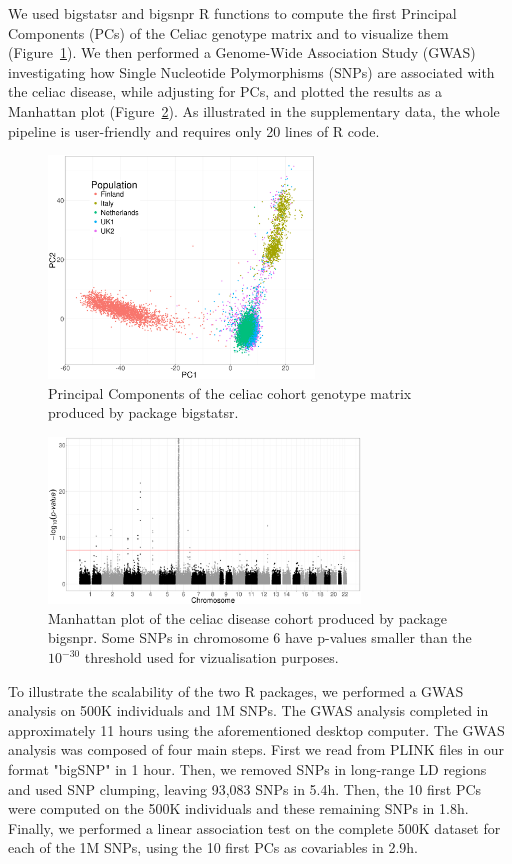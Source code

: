\documentclass{bioinfo}
\begin{document}
We used bigstatsr and bigsnpr R functions to compute the first Principal Components (PCs) of the Celiac genotype matrix and to visualize them (Figure~\ref{fig:pca}). We then performed a Genome-Wide Association Study (GWAS) investigating how Single Nucleotide Polymorphisms (SNPs) are associated with the celiac disease, while adjusting for PCs, and plotted the results as a Manhattan plot (Figure~\ref{fig:gwas}). As illustrated in the supplementary data, the whole pipeline is user-friendly and requires only 20 lines of R code.

\begin{figure}[!tpb]
\centerline{\includegraphics[width=200pt]{celiac-pca}}
\caption{Principal Components of the celiac cohort genotype matrix produced by package bigstatsr.}\label{fig:pca}
\end{figure}

\begin{figure}[!tpb]
\centerline{\includegraphics[width=235pt]{celiac-gwas-cut}}
\caption{Manhattan plot of the celiac disease cohort produced by package bigsnpr. Some SNPs in chromosome 6 have p-values smaller than the $10^{-30}$ threshold used for vizualisation purposes.}\label{fig:gwas}
\end{figure}

To illustrate the scalability of the two R packages, we performed a GWAS analysis on 500K individuals and 1M SNPs. The GWAS analysis completed in approximately 11 hours using the aforementioned desktop computer. The GWAS analysis was composed of four main steps. 
First we read from PLINK files in our format "bigSNP" in 1 hour.
Then, we removed SNPs in long-range LD regions and used SNP clumping, leaving 93,083 SNPs in 5.4h. Then, the 10 first PCs were computed on the 500K individuals and these remaining SNPs in 1.8h. Finally, we performed a linear association test on the complete 500K dataset for each of the 1M SNPs, using the 10 first PCs as covariables in 2.9h.
\end{document}
